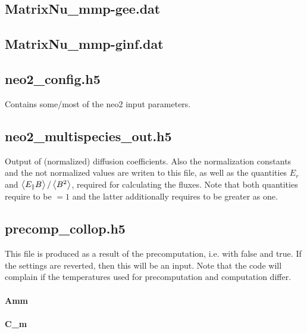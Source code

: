 \subsection{MatrixNu\_mmp-gee.dat}

\subsection{MatrixNu\_mmp-ginf.dat}

\subsection{neo2\_config.h5}
Contains some/most of the neo2 input parameters.

\subsection{neo2\_multispecies\_out.h5}
Output of (normalized) diffusion coefficients. Also the normalization
constants and the not normalized values are writen to this file, as well
as the quantities $E_r$ and $\left\langle E_{\parallel} B\right\rangle/\left\langle B^2\right\rangle$,
required for calculating the fluxes.
Note that both quantities require  to be
$=1$ and the latter additionally requires  to be
greater as one.

\subsection{precomp\_collop.h5}
This file is produced as a result of the precomputation, i.e. with
 false and
 true. If the settings are
reverted, then this will be an input.
Note that the code will complain if the temperatures used for
precomputation and computation differ.

\paragraph{Amm}

\paragraph{C\_m}


